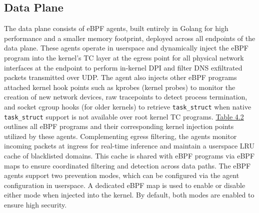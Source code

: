\documentclass [11pt, proquest] {uwthesis}[2020/02/24]
\begin{document}
\subsection{Data Plane}
The data plane consists of eBPF agents, built entirely in Golang for high performance and a smaller memory footprint, deployed across all endpoints of the data plane. These agents operate in userspace and dynamically inject the eBPF program into the kernel’s TC layer at the egress point for all physical network interfaces at the endpoint to perform in-kernel DPI and filter DNS exfiltrated packets transmitted over UDP. The agent also injects other eBPF programs attached kernel hook points such as kprobes (kernel probes) to monitor the creation of new network devices, raw tracepoints to detect process termination, and socket cgroup hooks (for older kernels) to retrieve \texttt{task\_struct} when native \texttt{task\_struct} support is not available over root kernel TC programs.  \hyperref[sec:dp_kernel_prog_ty]{Table 4.2} outlines all eBPF programs and their corresponding kernel injection points utilized by these agents. Complementing egress filtering, the agents monitor incoming packets at ingress for real-time inference and maintain a userspace LRU cache of blacklisted domains. This cache is shared with eBPF programs via eBPF maps to ensure coordinated filtering and detection across data paths. The eBPF agents support two prevention modes, which can be configured via the agent configuration in userspace. A dedicated eBPF map is used to enable or disable either mode when injected into the kernel. By default, both modes are enabled to ensure high security.
\end{document}
